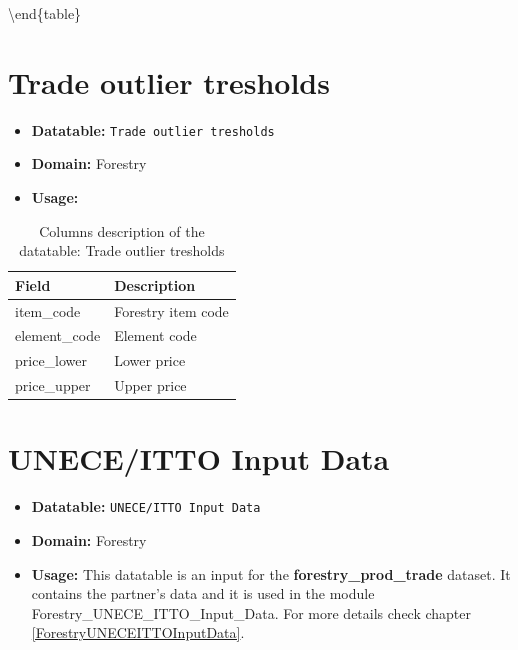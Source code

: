 \documentclass[
]{book}
\providecommand{\tightlist}{%
  \setlength{\itemsep}{0pt}\setlength{\parskip}{0pt}}
\begin{document}
\textbackslash end\{table\}

\hypertarget{trade-outlier-tresholds}{%
\section*{Trade outlier tresholds}\label{trade-outlier-tresholds}}

\begin{itemize}
\tightlist
\item
  \textbf{Datatable:} \texttt{Trade\ outlier\ tresholds}
\item
  \textbf{Domain:} Forestry
\item
  \textbf{Usage:}
\end{itemize}

\begin{table}

\caption{\label{tab:Tradeoutliertresholds}Columns description of the datatable: Trade outlier tresholds}
\centering
\fontsize{14}{16}\selectfont
\begin{tabular}[t]{l|l}
\hline
\rowcolor[HTML]{a9c9a7}  Field & Description\\
\hline
item\_code & Forestry item code\\
\hline
element\_code & Element code\\
\hline
price\_lower & Lower price\\
\hline
price\_upper & Upper price\\
\hline
\end{tabular}
\end{table}

\hypertarget{uneceitto-input-data}{%
\section*{UNECE/ITTO Input Data}\label{uneceitto-input-data}}

\begin{itemize}
\tightlist
\item
  \textbf{Datatable:} \texttt{UNECE/ITTO\ Input\ Data}
\item
  \textbf{Domain:} Forestry
\item
  \textbf{Usage:} This datatable is an input for the \textbf{forestry\_prod\_trade} dataset. It contains the partner's data and it is used in the module Forestry\_UNECE\_ITTO\_Input\_Data. For more details check chapter \ref{ForestryUNECEITTOInputData}.
\end{itemize}
\end{document}
